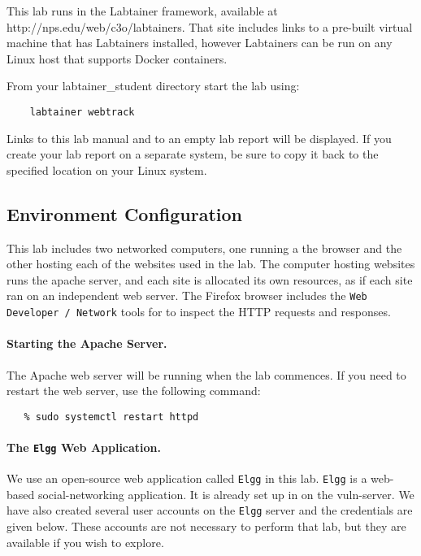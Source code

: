 
This lab runs in the Labtainer framework,
available at http://nps.edu/web/c3o/labtainers.
That site includes links to a pre-built virtual machine
that has Labtainers installed, however Labtainers can
be run on any Linux host that supports Docker containers.

From your labtainer_student directory start the lab using:
\begin{verbatim}
    labtainer webtrack
\end{verbatim}
Links to this lab manual and to an empty lab report will be displayed.  If you create your lab report on a separate system,
be sure to copy it back to the specified location on your Linux system.

\subsection{Environment Configuration}
This lab includes two networked computers, one running a the browser
and the other hosting each of the websites used in the lab. The computer
hosting websites runs the apache server, and each site is allocated its 
own resources, as if each site ran on an independent web server.
The Firefox browser includes the  \texttt{Web Developer / Network} tools for 
to inspect the HTTP requests and responses.  


\paragraph{Starting the Apache Server.}
The Apache web server will be running when the lab
commences.  If you need to restart the web server, use
the following command:
\begin{verbatim}
   % sudo systemctl restart httpd
\end{verbatim}

\paragraph{The {\tt Elgg} Web Application.}
We use an open-source web application called {\tt Elgg} in this lab.
{\tt Elgg} is a web-based social-networking application. 
It is already set up in on the vuln-server.
We have also created several user accounts on the {\tt Elgg} server and the credentials are given below.
These accounts are not necessary to perform that lab, but they are available if you wish to explore.


